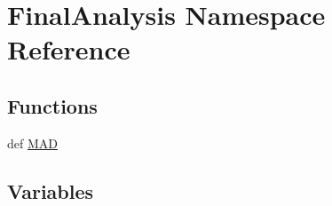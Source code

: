 \hypertarget{namespace_final_analysis}{\section{Final\-Analysis Namespace Reference}
\label{namespace_final_analysis}
}
\subsection*{Functions}
\begin{DoxyCompactItemize}
\item 
def \hyperlink{namespace_final_analysis_aa2936d2049a535da38d4b9777acc0e22}{M\-A\-D}
\end{DoxyCompactItemize}
\subsection*{Variables}
